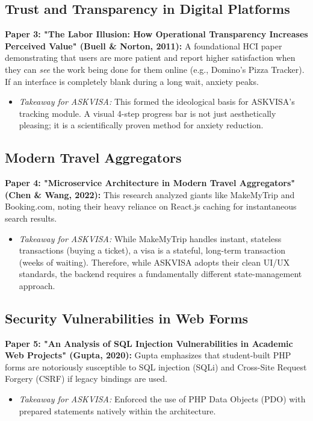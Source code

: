 \documentclass[12pt, a4paper]{article}
\begin{document}
\subsection{Trust and Transparency in Digital Platforms}
\textbf{Paper 3: "The Labor Illusion: How Operational Transparency Increases Perceived Value" (Buell \& Norton, 2011):} A foundational HCI paper demonstrating that users are more patient and report higher satisfaction when they can \textit{see} the work being done for them online (e.g., Domino's Pizza Tracker). If an interface is completely blank during a long wait, anxiety peaks.
\begin{itemize}
    \item \textit{Takeaway for ASKVISA:} This formed the ideological basis for ASKVISA’s tracking module. A visual 4-step progress bar is not just aesthetically pleasing; it is a scientifically proven method for anxiety reduction.
\end{itemize}

\subsection{Modern Travel Aggregators}
\textbf{Paper 4: "Microservice Architecture in Modern Travel Aggregators" (Chen \& Wang, 2022):} This research analyzed giants like MakeMyTrip and Booking.com, noting their heavy reliance on React.js caching for instantaneous search results.
\begin{itemize}
    \item \textit{Takeaway for ASKVISA:} While MakeMyTrip handles instant, stateless transactions (buying a ticket), a visa is a stateful, long-term transaction (weeks of waiting). Therefore, while ASKVISA adopts their clean UI/UX standards, the backend requires a fundamentally different state-management approach.
\end{itemize}

\subsection{Security Vulnerabilities in Web Forms}
\textbf{Paper 5: "An Analysis of SQL Injection Vulnerabilities in Academic Web Projects" (Gupta, 2020):} Gupta emphasizes that student-built PHP forms are notoriously susceptible to SQL injection (SQLi) and Cross-Site Request Forgery (CSRF) if legacy bindings are used.
\begin{itemize}
    \item \textit{Takeaway for ASKVISA:} Enforced the use of PHP Data Objects (PDO) with prepared statements natively within the architecture.
\end{itemize}
\end{document}

